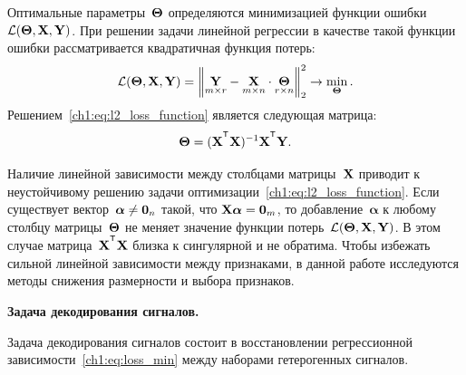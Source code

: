\documentclass[11pt, a5paper]{dissert}
\begin{document}
Оптимальные параметры~$\boldsymbol{\Theta}$ определяются минимизацией функции ошибки $\mathcal{L}(\boldsymbol{\Theta}, \mathbf{X}, \mathbf{Y})$.
При решении задачи линейной регрессии в качестве такой функции ошибки рассматривается квадратичная функция потерь:
\begin{equation}
	\mathcal{L}(\boldsymbol{\Theta}, \mathbf{X}, \mathbf{Y}) = {\left\| \underset{m \times r}{\mathbf{Y}}  - \underset{m \times n}{\mathbf{X}} \cdot \underset{r \times n}{\boldsymbol{\Theta}} \right\| }_2^2 \rightarrow\min_{\boldsymbol{\Theta}}.
	\label{ch1:eq:l2_loss_function}
\end{equation}
Решением~\eqref{ch1:eq:l2_loss_function} является следующая матрица:
\begin{equation*}
	\bTheta = (\bX^{\T} \bX)^{-1} \bX^{\T} \bY.
\end{equation*}

Наличие линейной зависимости между столбцами матрицы~$\mathbf{X}$ приводит к неустойчивому решению задачи оптимизации~\eqref{ch1:eq:l2_loss_function}.
Если существует вектор~$\boldsymbol{\alpha} \neq \boldsymbol{0}_n$ такой, что $\mathbf{X} \boldsymbol{\alpha}= \boldsymbol{0}_m$, то добавление~$\boldsymbol{\alpha}$ к любому столбцу матрицы~$\boldsymbol{\Theta}$ не меняет значение функции потерь~$\mathcal{L}(\boldsymbol{\Theta}, \mathbf{X}, \mathbf{Y})$.
В этом случае матрица~$\bX^{\T} \bX$ близка к сингулярной и не обратима.
Чтобы избежать сильной линейной зависимости между признаками, в данной работе исследуются методы снижения размерности и выбора признаков.

\textbf{Задача декодирования сигналов.}
\label{sec:ch1:decoding_task}

Задача декодирования сигналов состоит в восстановлении регрессионной зависимости~\eqref{ch1:eq:loss_min} между наборами гетерогенных сигналов.
\end{document}
